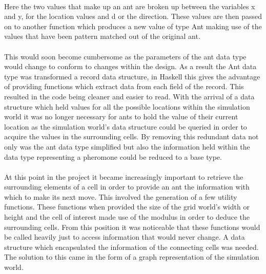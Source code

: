 \documentclass[main.tex]{subfiles}
\begin{document}
\paragraph{}Here the two values that make up an ant are broken up between the variables x and y, for the location values and d or the direction. These values are then passed on to another function which produces a new value of type Ant making use of the values that have been pattern matched out of the original ant.

\paragraph{}This would soon become cumbersome as the parameters of the ant data type would change to conform to changes within the design. As a result the Ant data type was transformed a record data structure, in Haskell this gives the advantage of providing functions which extract data from each field of the record. This resulted in the code being cleaner and easier to read. With the arrival of a data structure which held values for all the possible locations within the simulation world it was no longer necessary for ants to hold the value of their current location as the simulation world's data structure could be queried in order to acquire the values in the surrounding cells. By removing this redundant data not only was the ant data type simplified but also the information held within the data type representing a pheromone could be reduced to a base type.

\paragraph{}At this point in the project it became increasingly important to retrieve the surrounding elements of a cell in order to provide an ant the information with which to make its next move. This involved the generation of a few utility functions. These functions when provided the size of the grid world's width or height and the cell of interest made use of the modulus in order to deduce the surrounding cells. From this position it was noticeable that these functions would be called heavily just to access information that would never change. A data structure which encapsulated the information of the connecting cells was needed. The solution to this came in the form of  a graph representation of the simulation world.
\end{document}
